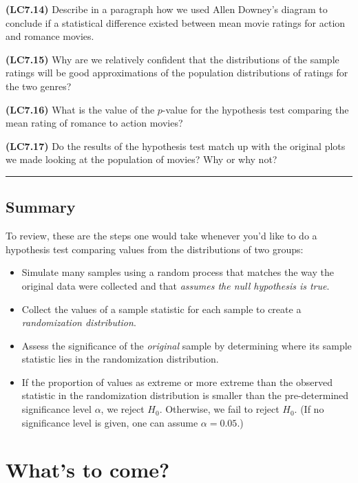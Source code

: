 \documentclass[]{tufte-book}
\let\oldrule=\rule
\renewcommand{\rule}[1]{\oldrule{\linewidth}}
\begin{document}
\textbf{(LC7.14)} Describe in a paragraph how we used Allen Downey's
diagram to conclude if a statistical difference existed between mean
movie ratings for action and romance movies.

\textbf{(LC7.15)} Why are we relatively confident that the distributions
of the sample ratings will be good approximations of the population
distributions of ratings for the two genres?

\textbf{(LC7.16)} What is the value of the \(p\)-value for the
hypothesis test comparing the mean rating of romance to action movies?

\textbf{(LC7.17)} Do the results of the hypothesis test match up with
the original plots we made looking at the population of movies? Why or
why not?

\begin{center}\rule{0.5\linewidth}{\linethickness}\end{center}

\subsection{Summary}\label{summary-5}

To review, these are the steps one would take whenever you'd like to do
a hypothesis test comparing values from the distributions of two groups:

\begin{itemize}
\item
  Simulate many samples using a random process that matches the way the
  original data were collected and that \emph{assumes the null
  hypothesis is true}.
\item
  Collect the values of a sample statistic for each sample to create a
  \emph{randomization distribution}.
\item
  Assess the significance of the \emph{original} sample by determining
  where its sample statistic lies in the randomization distribution.
\item
  If the proportion of values as extreme or more extreme than the
  observed statistic in the randomization distribution is smaller than
  the pre-determined significance level \(\alpha\), we reject \(H_0\).
  Otherwise, we fail to reject \(H_0\). (If no significance level is
  given, one can assume \(\alpha = 0.05\).)
\end{itemize}

\section{What's to come?}\label{whats-to-come-4}
\end{document}
